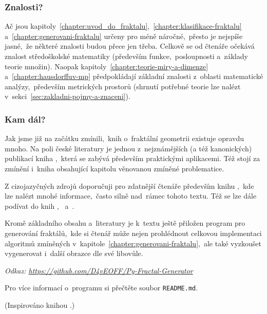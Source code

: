 \subsubsection{Znalosti?}

Ač jsou kapitoly~\ref{chapter:uvod_do_fraktalu},~\ref{chapter:klasifikace-fraktalu} a~\ref{chapter:generovani-fraktalu} určeny pro méně náročné,~přesto je nejspíše jasné,~že některé znalosti budou přece jen třeba. Celkově se od čtenáře očekává znalost středoškolské matematiky (především funkce,~posloupnosti a~základy teorie množin). Naopak kapitoly~\ref{chapter:teorie-miry-a-dimenze} a~\ref{chapter:hausdorffuv-mp} předpokládají základní znalosti z~oblasti matematické analýzy,~především metrických prostorů (shrnutí potřebné teorie lze nalézt v~sekci~\ref{sec:zakladni-pojmy-a-znaceni}).

\subsubsection{Kam dál?}

Jak jsme již na začátku zmínili,~knih o~fraktální geometrii existuje opravdu mnoho. Na poli české literatury je jednou z~nejznámějších (a též kanonických) publikací kniha \cite{Zelinka2006},~která se zabývá především praktickými aplikacemi. Též stojí za zmínění i~kniha \cite{Voracova2022} obsahující kapitolu věnovanou zmíněné problematice.

Z cizojazyčných zdrojů doporučuji pro zdatnější čtenáře především knihu \cite{Falconer1989},~kde lze nalézt mnohé informace,~často silně nad~rámec tohoto textu. Též se lze dále podívat do knih \cite{Prusinkiewicz1990},~\cite{Edgar2008} a~\cite{Mattila1995}.

Kromě základního obsahu a~literatury je k~textu ještě přiložen program pro generování fraktálů,~kde si čtenář může nejen prohlédnout celkovou implementaci algoritmů zmíněných v~kapitole~\ref{chapter:generovani-fraktalu},~ale také vyzkoušet vygenerovat i~další obrazce dle své libovůle.

\textit{Odkaz: \url{https://github.com/D4vEOFF/Py-Fractal-Generator}}

Pro více informací o~programu si přečtěte soubor \texttt{README.md}.

(Inspirováno knihou \cite{Hladik2019}.)